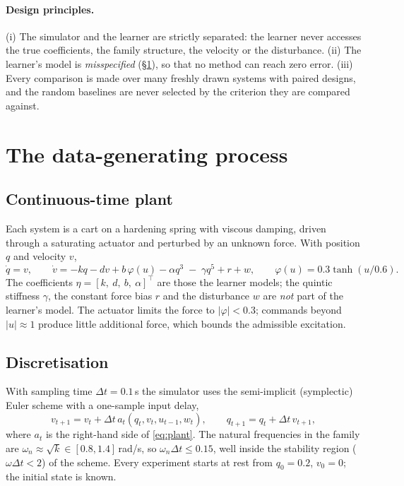 \documentclass[11pt,a4paper]{article}
\begin{document}
\paragraph{Design principles.} (i) The simulator and the learner are strictly separated: the
learner never accesses the true coefficients, the family structure, the velocity or the
disturbance. (ii) The learner's model is \emph{misspecified} (\S\ref{sec:plant}), so that no method
can reach zero error. (iii) Every comparison is made over many freshly drawn systems with paired
designs, and the random baselines are never selected by the criterion they are compared against.

\section{The data-generating process}\label{sec:plant}

\subsection{Continuous-time plant}
Each system is a cart on a hardening spring with viscous damping, driven through a saturating
actuator and perturbed by an unknown force. With position $q$ and velocity $v$,
\begin{equation}\label{eq:plant}
  \dot q = v,\qquad
  \dot v = -k q - d v + b\,\varphi(u) - \alpha q^3 \;-\; \gamma q^5 + r + w ,
  \qquad \varphi(u) = 0.3\tanh(u/0.6).
\end{equation}
The coefficients $\eta = [k,\ d,\ b,\ \alpha]^\top$ are those the learner models; the quintic
stiffness $\gamma$, the constant force bias $r$ and the disturbance $w$ are \emph{not} part of the
learner's model. The actuator limits the force to $|\varphi|<0.3$; commands beyond $|u|\approx 1$
produce little additional force, which bounds the admissible excitation.

\subsection{Discretisation}
With sampling time $\Delta t = 0.1$\,s the simulator uses the semi-implicit (symplectic) Euler scheme
with a one-sample input delay,
\begin{equation}\label{eq:disc}
  v_{t+1} = v_t + \Delta t\,a_t(q_t, v_t, u_{t-1}, w_t),\qquad q_{t+1} = q_t + \Delta t\, v_{t+1},
\end{equation}
where $a_t$ is the right-hand side of \eqref{eq:plant}. The natural frequencies in the family are
$\omega_n\approx\sqrt{k}\in[0.8,1.4]$\,rad/s, so $\omega_n\Delta t\le 0.15$, well inside the
stability region ($\omega\Delta t<2$) of the scheme. Every experiment starts at rest from
$q_0=0.2$, $v_0=0$; the initial state is known.
\end{document}
